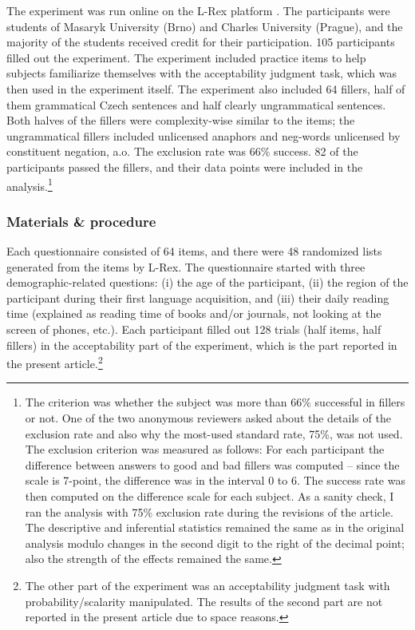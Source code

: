 \documentclass[output=paper,colorlinks,citecolor=brown]{langscibook}
\begin{document}
The experiment was run online on the L-Rex platform \citep{l-rex2023}. The participants were students of Masaryk University (Brno) and Charles University (Prague), and the majority of the students received credit for their participation. 105 participants filled out the experiment. The experiment included practice items to help subjects familiarize themselves with the acceptability judgment task, which was then used in the experiment itself. The experiment also included 64 fillers, half of them grammatical Czech sentences and half clearly ungrammatical sentences. Both halves of the fillers were complexity-wise similar to the items; the ungrammatical fillers included unlicensed anaphors and neg-words unlicensed by constituent negation, a.o. The exclusion rate was 66\% success. 82 of the participants passed the fillers, and their data points were included in the analysis.\footnote {\label{fn:success}The criterion was whether the subject was more than 66\% successful in fillers or not. One of the two anonymous reviewers asked about the details of the exclusion rate and also why the most-used standard rate, 75\%, was not used. The exclusion criterion was measured as follows: For each participant the difference between answers to good and bad fillers was computed -- since the scale is 7-point, the difference was in the interval 0 to 6. The success rate was then computed on the difference scale for each subject. As a sanity check, I ran the analysis with 75\% exclusion rate during the revisions of the article. The descriptive and inferential statistics remained the same as in the original analysis modulo changes in the second digit to the right of the decimal point; also the strength of the effects remained the same.} 

\subsubsection{Materials \& procedure}

Each questionnaire consisted of 64 items, and there were 48 randomized lists generated from the items by L-Rex. The questionnaire started with three demographic-related questions: (i) the age of the participant, (ii) the region of the participant during their first language acquisition, and (iii) their daily reading time (explained as reading time of books and/or journals, not looking at the screen of phones, etc.). Each participant filled out 128 trials (half items, half fillers) in the acceptability part of the experiment, which is the part reported in the present article.\footnote{\label{footnote:the_other}The other part of the experiment was an acceptability judgment task with probability/scalarity manipulated. The results of the second part are not reported in the present article due to space reasons.}
\end{document}
